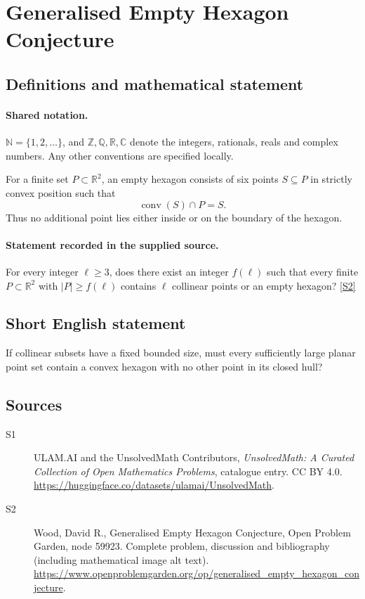 \documentclass[11pt]{book}
\newcommand{\sref}[2]{\hyperlink{source:#1:#2}{[S#2]}}
\begin{document}
\section{Generalised Empty Hexagon Conjecture}\label{statement}

\subsection{Definitions and mathematical statement}

\paragraph{Shared notation.}$\mathbb N=\{1,2,\ldots\}$, and $\mathbb Z,\mathbb Q,\mathbb R,\mathbb C$ denote the integers, rationals, reals and complex numbers. Any other conventions are specified locally.


For a finite set $P\subset\mathbb R^2$, an empty hexagon consists of six points $S\subseteq P$ in strictly convex position such that
\[\operatorname{conv}(S)\cap P=S.\]
Thus no additional point lies either inside or on the boundary of the hexagon.
\paragraph{Statement recorded in the supplied source.}
For every integer $\ell\geq3$, does there exist an integer $f(\ell)$ such that every finite $P\subset\mathbb R^2$ with $|P|\geq f(\ell)$ contains $\ell$ collinear points or an empty hexagon? \sref{statement}{2}
\subsection{Short English statement}
If collinear subsets have a fixed bounded size, must every sufficiently large planar point set contain a convex hexagon with no other point in its closed hull?
\subsection{Sources}
\begin{description}
\item[\hypertarget{source:statement:1}{S1}] ULAM.AI and the UnsolvedMath Contributors, \emph{UnsolvedMath: A Curated Collection of Open Mathematics Problems}, catalogue entry. CC BY 4.0. \url{https://huggingface.co/datasets/ulamai/UnsolvedMath}.
\item[\hypertarget{source:statement:2}{S2}] Wood, David R., Generalised Empty Hexagon Conjecture, Open Problem Garden, node 59923. Complete problem, discussion and bibliography (including mathematical image alt text). \url{https://www.openproblemgarden.org/op/generalised_empty_hexagon_conjecture}.
\end{description}
\label{end:statement}
\end{document}
